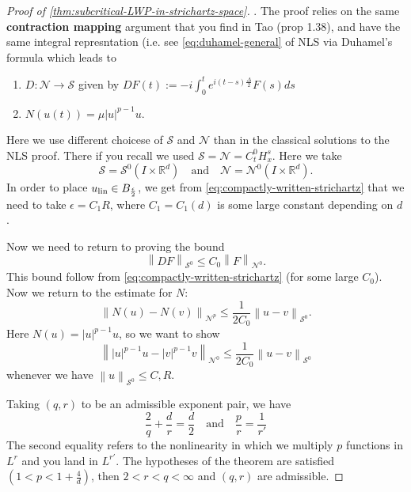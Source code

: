 \documentclass{article}
\def\R{\mathbb{R}} %
\newcommand\norm[1]{\left\lVert#1\right\rVert}
\begin{document}
\begin{proof}[Proof of \cref{thm:subcritical-LWP-in-strichartz-space}].
  The proof relies on the same \textbf{contraction mapping} argument that you find in Tao
  (prop 1.38), and have the same integral represntation (i.e. see
  \cref{eq:duhamel-general} of NLS via Duhamel's
  formula which leads to
  \begin{enumerate}
    \item $D:\mathcal{N} \to \mathcal{S}$ given by
    $DF(t):=-i \int_{0}^{t}e^{i(t-s)\frac{\Delta}{2}}F(s)ds $
    \item $N(u(t))=\mu |u|^{p-1}u$. 
  \end{enumerate}
  Here we use different choicese of $\mathcal{S}$ and $\mathcal{N}$ than in the
  classical solutions to the NLS proof. There if you recall we used
  $\mathcal{S}=\mathcal{N}=C_{t}^{0}H_{x}^{s}$.
  Here we take
  \begin{equation*}
    \mathcal{S} = \mathcal{S}^{0}(I\times \R^d)
    \quad \text{and} \quad
    \mathcal{N} = \mathcal{N}^{0}(I\times \R^d).
  \end{equation*}
  In order to place $u_{\rm lin}\in B_{\frac{\epsilon}{2}}$, we get from
  \cref{eq:compactly-written-strichartz} that we need to take $\epsilon=C_{1}R$,
  where $C_{1}=C_{1}(d)$ is some large constant depending on $d$.

  Now we need to return to proving the bound
  \begin{equation*}
    \norm{DF}_{\mathcal{S}^{0}} \leq C_{0} \norm{F}_{\mathcal{N}^{0}}.
  \end{equation*}
  This bound follow from \cref{eq:compactly-written-strichartz} (for some large
  $C_{0}$). Now we return to the estimate for $N$:
  \begin{equation*}
    \norm{N(u)-N(v)}_{\mathcal{N}^{p}} 
    \leq \frac{1}{2C_{0}} \norm{u-v}_{\mathcal{S}^{0}}.
  \end{equation*}
  Here $N(u) = |u|^{p-1}u$, so we want to show
  \begin{equation}\label{eq:16-right-arrow}
    \norm{|u|^{p-1}u-|v|^{p-1}v}_{\mathcal{N}^{0}} 
    \leq \frac{1}{2C_{0}} \norm{u-v}_{\mathcal{S}^{0}}
  \end{equation}
  whenever we have $\norm{u}_{\mathcal{S}^{0}}\leq C,R$.

  Taking $(q,r)$ to be an admissible exponent pair, we have
  \begin{equation*}
    \frac{2}{q}+\frac{d}{r} = \frac{d}{2}
    \quad \text{and} \quad
    \frac{p}{r} = \frac{1}{r'}
  \end{equation*}
  The second equality refers to the nonlinearity in which we multiply $p$
  functions in $L^{r}$ and you land in $L^{r'}$. The hypotheses of the theorem
  are satisfied $(1 < p<1+\frac{4}{d})$, then $2<r<q<\infty$ and $(q,r)$ are
  admissible.


\end{proof}
\end{document}
